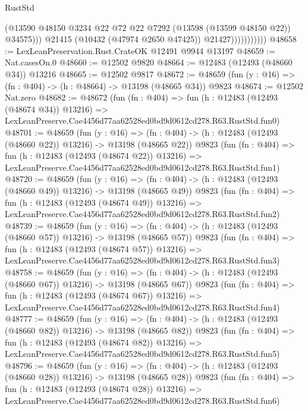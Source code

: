 \begin{lexlean}{RustStd}
\begin{coremodule}
                              (@13590
                                @48150
                                @3234
                                @22
                                @72
                                @22
                                @7292
                                (@13598 (@13599 @48150 @22))
                                @34575)))
                          @21415
                          (@10432 (@47974 @2650 @47425))
                          @21427)))))))))))
@48658 := LexLeanPreservation.Rust.CrateOK @12491 @9944 @13197
@48659 := Nat.casesOn.{0}
@48660 := @12502 @9820
@48664 := @12483 (@12493 (@48660 @34)) @13216
@48665 := @12502 @9817
@48672 := @48659 (fun (y : @16) => (fn : @404) -> (h : @48664) -> @13198 (@48665 @34)) @9823
@48674 := @12502 Nat.zero
@48682 := @48672
    (fun (fn : @404) =>
    fun (h : @12483 (@12493 (@48674 @34)) @13216) =>
    LexLeanPreserve.Cae4456d77aa62528ed0bd9d0612cd278.R63.RustStd.fun0)
@48701 := @48659
    (fun (y : @16) =>
    (fn : @404) -> (h : @12483 (@12493 (@48660 @22)) @13216) -> @13198 (@48665 @22))
    @9823
    (fun (fn : @404) =>
    fun (h : @12483 (@12493 (@48674 @22)) @13216) =>
    LexLeanPreserve.Cae4456d77aa62528ed0bd9d0612cd278.R63.RustStd.fun1)
@48720 := @48659
    (fun (y : @16) =>
    (fn : @404) -> (h : @12483 (@12493 (@48660 @49)) @13216) -> @13198 (@48665 @49))
    @9823
    (fun (fn : @404) =>
    fun (h : @12483 (@12493 (@48674 @49)) @13216) =>
    LexLeanPreserve.Cae4456d77aa62528ed0bd9d0612cd278.R63.RustStd.fun2)
@48739 := @48659
    (fun (y : @16) =>
    (fn : @404) -> (h : @12483 (@12493 (@48660 @57)) @13216) -> @13198 (@48665 @57))
    @9823
    (fun (fn : @404) =>
    fun (h : @12483 (@12493 (@48674 @57)) @13216) =>
    LexLeanPreserve.Cae4456d77aa62528ed0bd9d0612cd278.R63.RustStd.fun3)
@48758 := @48659
    (fun (y : @16) =>
    (fn : @404) -> (h : @12483 (@12493 (@48660 @67)) @13216) -> @13198 (@48665 @67))
    @9823
    (fun (fn : @404) =>
    fun (h : @12483 (@12493 (@48674 @67)) @13216) =>
    LexLeanPreserve.Cae4456d77aa62528ed0bd9d0612cd278.R63.RustStd.fun4)
@48777 := @48659
    (fun (y : @16) =>
    (fn : @404) -> (h : @12483 (@12493 (@48660 @82)) @13216) -> @13198 (@48665 @82))
    @9823
    (fun (fn : @404) =>
    fun (h : @12483 (@12493 (@48674 @82)) @13216) =>
    LexLeanPreserve.Cae4456d77aa62528ed0bd9d0612cd278.R63.RustStd.fun5)
@48796 := @48659
    (fun (y : @16) =>
    (fn : @404) -> (h : @12483 (@12493 (@48660 @28)) @13216) -> @13198 (@48665 @28))
    @9823
    (fun (fn : @404) =>
    fun (h : @12483 (@12493 (@48674 @28)) @13216) =>
    LexLeanPreserve.Cae4456d77aa62528ed0bd9d0612cd278.R63.RustStd.fun6)

\end{coremodule}
\end{lexlean}
